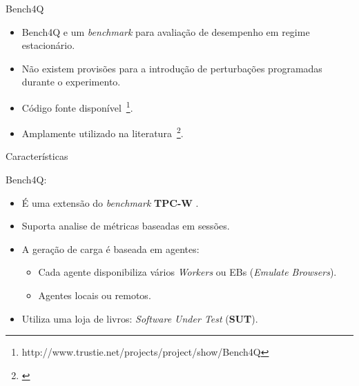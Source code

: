 \begin{frame}{Bench4Q}

\begin{itemize}
\item Bench4Q e um \textit{benchmark} para avaliação de desempenho em regime estacionário.

\item Não existem provisões para a introdução de perturbações programadas durante o experimento.

\item Código fonte disponível~\footnote{http://www.trustie.net/projects/project/show/Bench4Q}.

\item Amplamente utilizado na literatura~\footnote{\cite{Wang2012b,Zhang2012a,Gao2013}}.
\end{itemize}


\end{frame}

\begin{frame}{Características}

Bench4Q:
\begin{itemize}
	\item É uma extensão do \textit{benchmark} \textbf{TPC-W} \cite{Garcia2003}.
	\item Suporta analise de métricas baseadas em sessões.
	\item A geração de carga é baseada em agentes:
	\begin{itemize}
		\item Cada agente disponibiliza vários \textit{Workers} ou EBs (\textit{Emulate Browsers}).
		\item Agentes locais ou remotos.
	\end{itemize}
	\item Utiliza uma loja de livros: \textit{Software Under Test} (\textbf{SUT}).
\end{itemize}

\end{frame}

